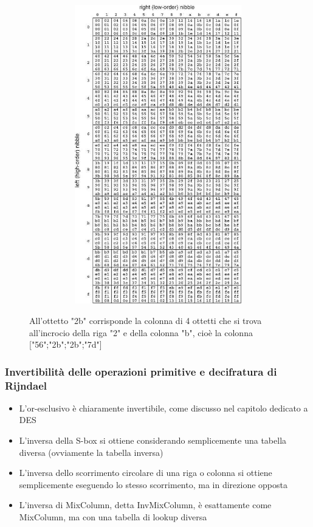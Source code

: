 \begin{figure}[htbp]
	\centering%
	\subfigure%
	{\includegraphics[height=13cm, width=13cm, keepaspectratio]{Immagini/chiave_segreta/rijndael_mixcol_lookup.png}}
	\caption{All'ottetto "2b" corrisponde la colonna di 4 ottetti che si trova all’incrocio della riga "2" e della colonna "b", cioè la colonna ["56";"2b";"2b";"7d"] \label{fig:Rij_mixcol_lookup}} 	
\end{figure}

\subsubsection{Invertibilità delle operazioni primitive e decifratura di Rijndael}
\begin{itemize}
  \item L'or-esclusivo è chiaramente invertibile, come discusso nel capitolo dedicato a DES
  \item L'inversa della S-box si ottiene considerando semplicemente una tabella diversa (ovviamente la tabella inversa)
  \item L'inversa dello scorrimento circolare di una riga o colonna si ottiene semplicemente eseguendo lo stesso scorrimento, ma in direzione opposta
  \item L'inversa di MixColumn, detta InvMixColumn, è esattamente come MixColumn, ma con una tabella di lookup diversa
\end{itemize}

